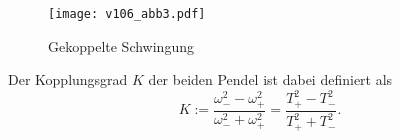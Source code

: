 \begin{figure}
    \centering
    \texttt{[image: v106\_abb3.pdf]}
    \caption{Gekoppelte Schwingung}
\end{figure}

Der Kopplungsgrad $K$ der beiden Pendel ist dabei definiert als
\begin{equation} 
    K := \dfrac{\omega_-^2-\omega_+^2}{\omega_-^2 + \omega_+^2} = \dfrac{T_+^2 - T_-^2}{T_+^2 + T_-^2} \text{.}
\label{eq:Kopplungsgrad}
\end{equation} \cite{ap01}



